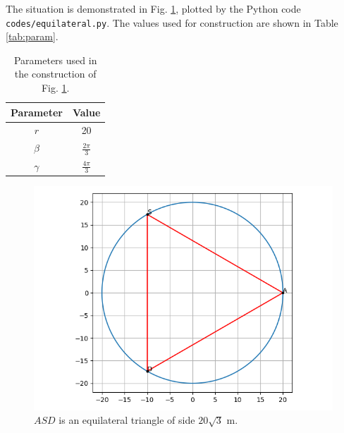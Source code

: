 \documentclass[journal,12pt,twocolumn]{IEEEtran}
\begin{document}
\begin{enumerate}
    The situation is demonstrated in Fig. \ref{fig:equilateral}, plotted by the 
    Python code \texttt{codes/equilateral.py}. The values used for 
    construction are shown in Table \eqref{tab:param}.
    \begin{table}[!ht]
        \centering
        \begin{tabular}{|c|c|}
            \hline
            \textbf{Parameter} & \textbf{Value} \\
            \hline
            $r$ & 20 \\
            \hline
            $\beta$ & $\frac{2\pi}{3}$ \\
            \hline
            $\gamma$ & $\frac{4\pi}{3}$ \\
            \hline
        \end{tabular}
        \caption{Parameters used in the construction of Fig. \ref{fig:equilateral}.}
        \label{tab:param}
    \end{table}
    \begin{figure}[!ht]
        \centering
        \includegraphics[width=\columnwidth]{figs/equilateral.png}
        \caption{$ASD$ is an equilateral triangle of side $20\sqrt{3}$ m.}
        \label{fig:equilateral}
    \end{figure}
\end{enumerate}
\end{document}

